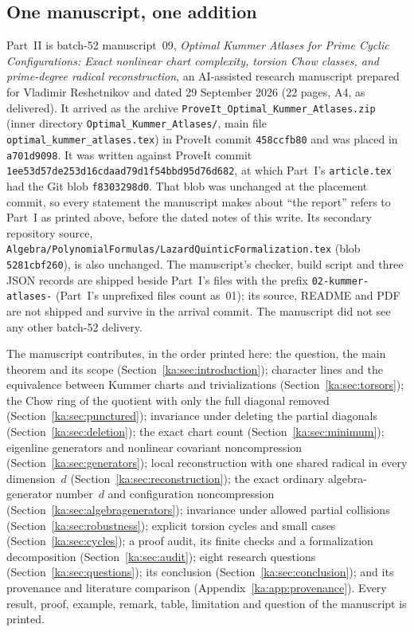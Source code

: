 \documentclass[11pt,a4paper]{article}
\theoremstyle{definition}
\theoremstyle{remark}
\newcommand{\code}[1]{{\small\nolinkurl{#1}}}
\begin{document}
\subsection{One manuscript, one addition}
\label{ka:sec:provenance}

Part~II is batch-52 manuscript~09, \emph{Optimal Kummer Atlases for Prime
Cyclic Configurations: Exact nonlinear chart complexity, torsion Chow
classes, and prime-degree radical reconstruction}, an AI-assisted research
manuscript prepared for Vladimir Reshetnikov and dated 29 September 2026
(22 pages, A4, as delivered). It arrived as the archive
\code{ProveIt_Optimal_Kummer_Atlases.zip} (inner directory
\code{Optimal_Kummer_Atlases/}, main file \code{optimal_kummer_atlases.tex})
in ProveIt commit \code{458ccfb80} and was placed in \code{a701d9098}. It was
written against ProveIt commit
\code{1ee53d57de253d16cdaad79d1f54bbd95d76d682}, at which Part~I's
\code{article.tex} had the Git blob \code{f8303298d0}. That blob was
unchanged at the placement commit, so every statement the manuscript makes
about ``the report'' refers to Part~I as printed above, before the dated
notes of this write. Its secondary repository source,
\code{Algebra/PolynomialFormulas/LazardQuinticFormalization.tex} (blob
\code{5281cbf260}), is also unchanged. The manuscript's checker, build script
and three JSON records are shipped beside Part~I's files with the prefix
\code{02-kummer-atlases-} (Part~I's unprefixed files count as~01); its
source, README and PDF are not shipped and survive in the arrival commit.
The manuscript did not see any other batch-52 delivery.

The manuscript contributes, in the order printed here: the question, the
main theorem and its scope (Section~\ref{ka:sec:introduction}); character
lines and the equivalence between Kummer charts and trivializations
(Section~\ref{ka:sec:torsors}); the Chow ring of the quotient with only the
full diagonal removed (Section~\ref{ka:sec:punctured}); invariance under
deleting the partial diagonals (Section~\ref{ka:sec:deletion}); the exact
chart count (Section~\ref{ka:sec:minimum}); eigenline generators and
nonlinear covariant noncompression (Section~\ref{ka:sec:generators}); local
reconstruction with one shared radical in every dimension~$d$
(Section~\ref{ka:sec:reconstruction}); the exact ordinary
algebra-generator number~$d$ and configuration noncompression
(Section~\ref{ka:sec:algebragenerators}); invariance under allowed partial
collisions (Section~\ref{ka:sec:robustness}); explicit torsion cycles and
small cases (Section~\ref{ka:sec:cycles}); a proof audit, its finite checks
and a formalization decomposition (Section~\ref{ka:sec:audit}); eight
research questions (Section~\ref{ka:sec:questions}); its conclusion
(Section~\ref{ka:sec:conclusion}); and its provenance and literature
comparison (Appendix~\ref{ka:app:provenance}). Every result, proof,
example, remark, table, limitation and question of the manuscript is
printed.
\end{document}
